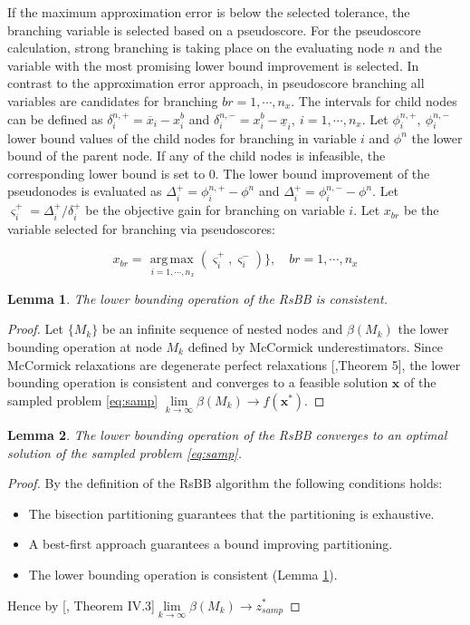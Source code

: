\documentclass[sn-mathphys-num]{sn-jnl}
\newtheorem{lemma}{Lemma}
\DeclareMathOperator*{\argmax}{arg\,max}
\begin{document}
If the maximum approximation error is below the selected tolerance, the branching variable is selected based on a pseudoscore. For the pseudoscore calculation, strong branching is taking place on the evaluating node $n$ and the variable with the most promising lower bound improvement is selected. In contrast to the approximation error approach, in pseudoscore branching all variables are candidates for branching $br=1,\cdots,n_x$. The intervals for child nodes can be defined as $\delta_i^{n,+}=\overline{x}_i- x_i^b$ and $\delta_i^{n,-}= x_i^b -\underline{x}_i, ~i=1,\cdots, n_x$. Let $\phi_i^{n,+},~\phi_i^{n,-}$ lower bound values of the child nodes for branching in variable $i$ and $\phi^{n}$ the lower bound of the parent node. If any of the child nodes is infeasible, the corresponding lower bound is set to 0. The lower bound improvement of the pseudonodes is evaluated as $\Delta_i^+=\phi_i^{n,+}-\phi^{n}$ and $\Delta_i^+=\phi_i^{n,-}-\phi^{n}$. Let $\varsigma_i^+=\Delta_i^+/\delta_i^+$ be the objective gain for branching on variable $i$. Let $x_{br}$ be the variable selected for branching via pseudoscores:

 \begin{equation}
     x_{br}=\underset{ ~i=1,\cdots,n_{x}}{\argmax}(\varsigma_i^+,\varsigma_i^-)\}, \quad br=1,\cdots,n_{x}
 \end{equation}

\begin{lemma} \label{lem:const}
    The lower bounding operation of the RsBB is consistent.
\end{lemma}
\begin{proof}
    Let $\{M_{k}\}$ be an infinite sequence of nested nodes and $\beta(M_{k})$ the lower bounding operation at node $M_{k}$ defined by McCormick underestimators. Since McCormick relaxations are degenerate perfect relaxations [\citet{Scott2011},Theorem 5], the lower bounding operation is consistent and converges to a feasible solution $\bm x$ of the sampled problem \eqref{eq:samp} $\underset{k\rightarrow \infty}{\lim}\beta(M_{k})\rightarrow f(\bm x^*)$.
\end{proof}

\begin{lemma}\label{lem:conv}
    The lower bounding operation of the RsBB converges to an optimal solution of the sampled problem \eqref{eq:samp}.
\end{lemma}

\begin{proof}
   By the definition of the RsBB algorithm the following conditions holds:
   \begin{itemize}
       \item The bisection partitioning guarantees that the partitioning is exhaustive.
       \item A best-first approach guarantees a bound improving partitioning.
       \item The lower bounding operation is consistent (Lemma \ref{lem:const}).
   \end{itemize}
Hence by [\citet{Horst1996}, Theorem IV.3]$ \underset{k\rightarrow \infty}{\lim}\beta(M_{k})\rightarrow z^*_{samp}$
\end{proof}
\end{document}
